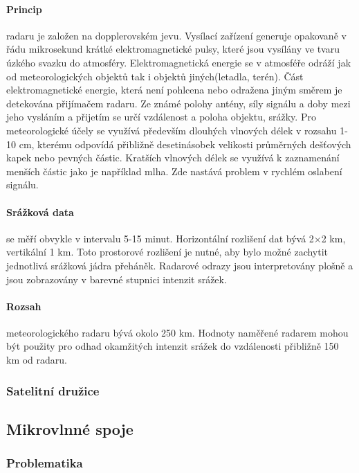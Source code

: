 \documentclass[a4paper,12pt]{article}
\begin{document}
\paragraph*{Princip}
radaru je založen na dopplerovském jevu.\cite{radar_meterology} Vysílací zařízení generuje opakovaně v řádu mikrosekund krátké elektromagnetické pulsy, které jsou vysílány ve tvaru úzkého svazku do atmosféry. Elektromagnetická energie se v atmosféře odráží jak od meteorologických objektů tak i objektů jiných(letadla, terén). Část elektromagnetické energie, která není pohlcena nebo odražena jiným směrem je detekována přijímačem radaru. Ze známé polohy antény, síly signálu a doby mezi jeho vysláním a přijetím se určí vzdálenost a poloha objektu, srážky. 
Pro meteorologické účely se využívá především dlouhých vlnových délek v rozsahu 1-10 cm, kterému odpovídá přibližně desetinásobek velikosti průměrných dešťových kapek nebo pevných částic. Kratších vlnových délek se využívá k zaznamenání menších částic jako je například mlha. Zde nastává problem v rychlém oslabení signálu.\cite{doppler}




\paragraph*{Srážková data}se měří obvykle v intervalu 5-15 minut. Horizontální rozlišení dat bývá 2×2 km, vertikální 1 km. Toto prostorové rozlišení je nutné, aby bylo možné zachytit jednotlivá srážková jádra přeháněk. Radarové odrazy jsou interpretovány plošně a jsou zobrazovány v barevné stupnici intenzit srážek.
\paragraph*{Rozsah} meteorologického radaru bývá okolo 250 km. Hodnoty naměřené radarem mohou být použity pro odhad okamžitých intenzit srážek do vzdálenosti přibližně 150 km od radaru.\cite{kohout}






\subsubsection{Satelitní družice}
\subsection{Mikrovlnné spoje}
\subsubsection{Problematika}
\end{document}
